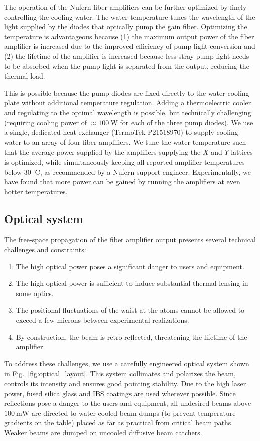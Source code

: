 \documentclass[twocolumn,aps,pra,showpacs,preprintnumbers,bibnotes]{revtex4-1}
\newcommand\unit[2]{\ensuremath{#1~\mathrm{{#2}}}}
\begin{document}
The operation of the Nufern fiber amplifiers can be further optimized by finely controlling the cooling water.
The water temperature tunes the wavelength of the light supplied by the diodes that optically pump the gain fiber.
Optimizing the temperature is advantageous because (1) the maximum output power of the fiber amplifier is increased due to the improved efficiency of pump light conversion and (2) the lifetime of the amplifier is increased because less stray pump light needs to be absorbed when the pump light is separated from the output, reducing the thermal load.

This is possible because the pump diodes are fixed directly to the water-cooling plate without additional temperature regulation.
Adding a thermoelectric cooler and regulating to the optimal wavelength is possible, but technically challenging (requiring cooling power of $\approx$\unit{100}{W} for each of the three pump diodes).
We use a single, dedicated heat exchanger (TermoTek P21518970) to supply cooling water to an array of four fiber amplifiers.
We tune the water temperature such that the average power supplied by the amplifiers supplying the $X$ and $Y$ lattices is optimized, while simultaneously keeping all reported amplifier temperatures below \unit{30}{^\circ{}C}, as recommended by a Nufern support engineer.
Experimentally, we have found that more power can be gained by running the amplifiers at even hotter temperatures.

\subsection{Optical system}
The free-space propagation of the fiber amplifier output presents several technical challenges and constraints:
\begin{enumerate}
  \item The high optical power poses a significant danger to users and equipment.
  \item The high optical power is sufficient to induce substantial thermal lensing in some optics.
  \item The positional fluctuations of the waist at the atoms cannot be allowed to exceed a few microns between experimental realizations.
  \item By construction, the beam is retro-reflected, threatening the lifetime of the amplifier.
  \end{enumerate}

To address these challenges, we use a carefully engineered optical system shown in Fig.~\ref{fig:optical_layout}.
This system collimates and polarizes the beam, controls its intensity and ensures good pointing stability.
Due to the high laser power, fused silica glass and IBS coatings are used wherever possible.
Since reflections pose a danger to the users and equipment, all undesired beams above \unit{100}{mW} are directed to water cooled beam-dumps (to prevent temperature gradients on the table) placed as far as practical from critical beam paths.
Weaker beams are dumped on uncooled diffusive beam catchers.
\end{document}

